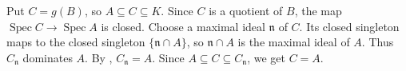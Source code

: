 Put $C=g(B)$, so $A\subseteq C\subseteq K$. Since $C$ is a quotient of $B$, the map $\operatorname{Spec}C\to\operatorname{Spec}A$ is closed. Choose a maximal ideal $\mathfrak{n}$ of $C$. Its closed singleton maps to the closed singleton $\{\mathfrak{n}\cap A\}$, so $\mathfrak{n}\cap A$ is the maximal ideal of $A$. Thus $C_{\mathfrak{n}}$ dominates $A$. By , $C_{\mathfrak{n}}=A$. Since $A\subseteq C\subseteq C_{\mathfrak{n}}$, we get $C=A$.
